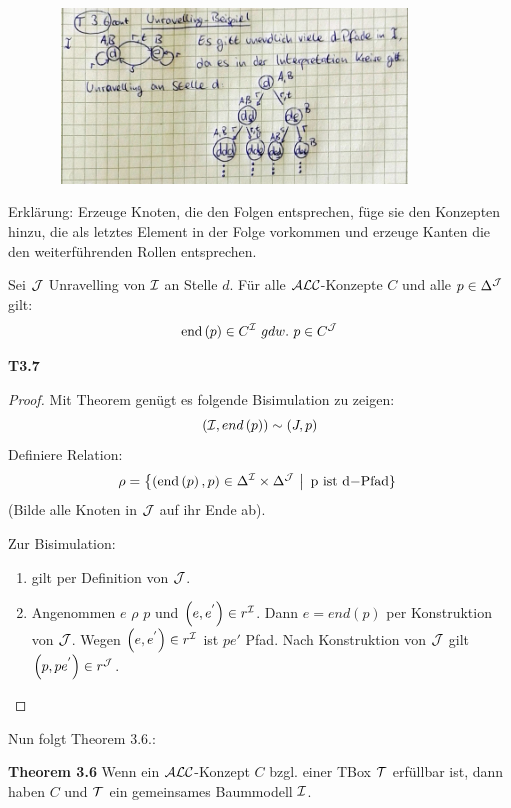 \includegraphics[width=4.71910in,height=1.83200in]{media/36unraveling.png}

Erklärung: Erzeuge Knoten, die den Folgen entsprechen, füge sie den
Konzepten hinzu, die als letztes Element in der Folge vorkommen und
erzeuge Kanten die den weiterführenden Rollen entsprechen.

\begin{lemma}\label{lemma37}
Sei $\mathcal{J}$ Unravelling von $\mathcal{I}$ an Stelle $d$. Für alle $\mathcal{A}\mathcal{L}\mathcal{C}$-Konzepte $C$ und alle $p \in \Delta^{\mathcal{J}}$ gilt:
$$\text{end}\left( p \right) \in C^{\MI}\ gdw.\ p \in C^{\MJ}$$
\end{lemma}

\textbf{T3.7}

\begin{proof}
Mit Theorem genügt es folgende Bisimulation zu zeigen:
$$\left( \mathcal{I},end\left( p \right) \right)\sim\left( J,p \right)$$ Definiere Relation: $$\rho = \left\{ \left( \text{end}\left( p \right),p \right) \in \Delta^{\MI} \times \Delta^{\MJ}\  \right|\text{\ p\ }\mathrm{\text{ist}}\text{\ d}\mathrm{- Pfad}\}\ $$(Bilde
alle Knoten in $\mathcal{J}$ auf ihr Ende ab). 

Zur Bisimulation:

\begin{enumerate}
\def\labelenumi{\arabic{enumi}.}
\item
  gilt per Definition von $\mathcal{J}$.
\item
  Angenommen $e$ $\rho$ $p$ und
  $\left( e,e^{'} \right) \in r^{\mathcal{I}}$. Dann $e = end\left( p \right)$
  per Konstruktion von $\mathcal{J}$. Wegen $\left( e,e^{'} \right) \in r^{\mathcal{I}}$
  ist $pe'$ Pfad. Nach Konstruktion von $\mathcal{J}$ gilt
  $\left( p,pe^{'} \right) \in r^{\mathcal{J}}$.
\end{enumerate}
\end{proof}

Nun folgt Theorem 3.6.:

\textbf{Theorem 3.6} Wenn ein $\mathcal{A}\mathcal{L}\mathcal{C}$-Konzept $C$ bzgl. einer TBox $\mathcal{T}$ erfüllbar ist, dann haben $C$ und $\mathcal{T}$ ein gemeinsames Baummodell $\mathcal{I}$.

